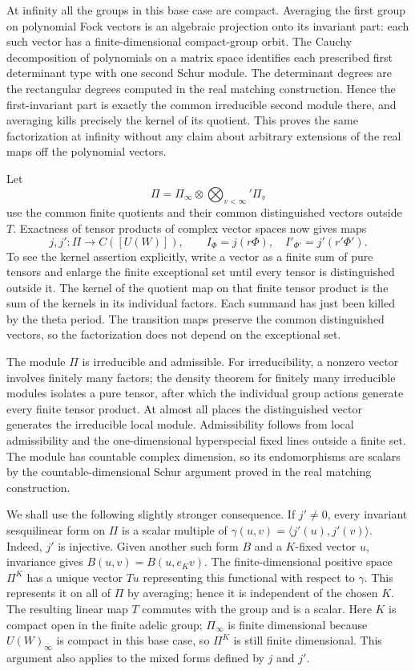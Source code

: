 At infinity all the groups in this base case are compact.
Averaging the first group on polynomial Fock vectors is an
algebraic projection onto its invariant part: each such vector
has a finite-dimensional compact-group orbit. The Cauchy
decomposition of polynomials on a matrix space identifies each
prescribed first determinant type with one second Schur module.
The determinant degrees are the rectangular degrees computed
in the real matching construction. Hence the first-invariant
part is exactly the common irreducible second module there,
and averaging kills precisely the kernel of its quotient.
This proves the same factorization at infinity without any
claim about arbitrary extensions of the real maps off the
polynomial vectors.

Let
\[
             \Pi=\Pi_\infty\otimes
                       \bigotimes_{v<\infty}'\Pi_v
\]
use the common finite quotients and their common distinguished
vectors outside \(T\). Exactness of tensor products of complex
vector spaces now gives maps
\[
        j,j':\Pi\longrightarrow C([U(W)]),\qquad
        I_\Phi=j(r\Phi),\quad I'_{\Phi'}=j'(r'\Phi').
\]
To see the kernel assertion explicitly, write a vector as a
finite sum of pure tensors and enlarge the finite exceptional
set until every tensor is distinguished outside it. The kernel
of the quotient map on that finite tensor product is the sum of
the kernels in its individual factors. Each summand has just
been killed by the theta period. The transition maps preserve
the common distinguished vectors, so the factorization does
not depend on the exceptional set.

The module \(\Pi\) is irreducible and admissible. For irreducibility,
a nonzero vector involves finitely many factors; the density
theorem for finitely many irreducible modules isolates a pure
tensor, after which the individual group actions generate every
finite tensor product. At almost all places the distinguished
vector generates the irreducible local module. Admissibility
follows from local admissibility and the one-dimensional
hyperspecial fixed lines outside a finite set. The module has
countable complex dimension, so its endomorphisms are scalars
by the countable-dimensional Schur argument proved in the real
matching construction.

We shall use the following slightly stronger consequence.
If \(j'\ne0\), every invariant sesquilinear form on \(\Pi\)
is a scalar multiple of
\(\gamma(u,v)=\langle j'(u),j'(v)\rangle\).
Indeed, \(j'\) is injective. Given another such form \(B\) and
a \(K\)-fixed vector \(u\), invariance gives
\(B(u,v)=B(u,e_Kv)\). The finite-dimensional positive space
\(\Pi^K\) has a unique vector \(Tu\) representing this functional
with respect to \(\gamma\). This represents it on all of \(\Pi\)
by averaging; hence it is independent of the chosen \(K\).
The resulting linear map \(T\) commutes with the group and is
a scalar. Here \(K\) is compact open in the finite adelic group;
\(\Pi_\infty\) is finite dimensional because \(U(W)_\infty\)
is compact in this base case, so \(\Pi^K\) is still finite
dimensional. This argument also applies to the mixed forms
defined by \(j\) and \(j'\).

